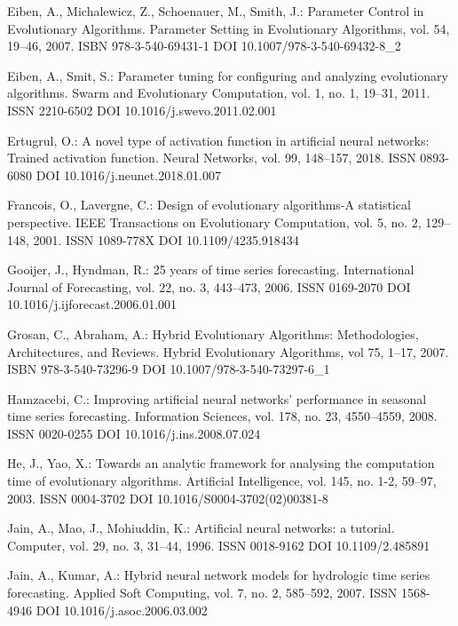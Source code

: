 \begin{thebibliography}{99.}
 Eiben, A., Michalewicz, Z., Schoenauer, M., Smith, J.: Parameter Control in Evolutionary Algorithms. Parameter Setting in Evolutionary Algorithms, vol. 54, 19--46, 2007. ISBN 978-3-540-69431-1 DOI 10.1007/978-3-540-69432-8\_2

 Eiben, A., Smit, S.: Parameter tuning for configuring and analyzing evolutionary algorithms. Swarm and Evolutionary Computation, vol. 1, no. 1, 19--31, 2011. ISSN 2210-6502 DOI 10.1016/j.swevo.2011.02.001

 Ertugrul, O.: A novel type of activation function in artificial neural networks: Trained activation function. Neural Networks, vol. 99, 148--157, 2018. ISSN 0893-6080 DOI 10.1016/j.neunet.2018.01.007

 Francois, O., Lavergne, C.: Design of evolutionary algorithms-A statistical perspective. IEEE Transactions on Evolutionary Computation, vol. 5, no. 2, 129--148, 2001. ISSN 1089-778X DOI 10.1109/4235.918434

 Gooijer, J., Hyndman, R.: 25 years of time series forecasting. International Journal of Forecasting, vol. 22, no. 3, 443--473, 2006. ISSN 0169-2070 DOI 10.1016/j.ijforecast.2006.01.001

 Grosan, C., Abraham, A.: Hybrid Evolutionary Algorithms: Methodologies, Architectures, and Reviews. Hybrid Evolutionary Algorithms, vol 75, 1--17, 2007. ISBN 978-3-540-73296-9 DOI 10.1007/978-3-540-73297-6\_1

 Hamzacebi, C.: Improving artificial neural networks’ performance in seasonal time series forecasting. Information Sciences, vol. 178, no. 23, 4550--4559, 2008. ISSN 0020-0255 DOI 10.1016/j.ins.2008.07.024

 He, J., Yao, X.: Towards an analytic framework for analysing the computation time of evolutionary algorithms. Artificial Intelligence, vol. 145, no. 1-2, 59--97, 2003. ISSN 0004-3702 DOI 10.1016/S0004-3702(02)00381-8

 Jain, A., Mao, J., Mohiuddin, K.: Artificial neural networks: a tutorial. Computer, vol. 29, no. 3, 31--44, 1996. ISSN 0018-9162 DOI 10.1109/2.485891

 Jain, A., Kumar, A.: Hybrid neural network models for hydrologic time series forecasting. Applied Soft Computing, vol. 7, no. 2, 585--592, 2007. ISSN 1568-4946 DOI 10.1016/j.asoc.2006.03.002


\end{thebibliography}
